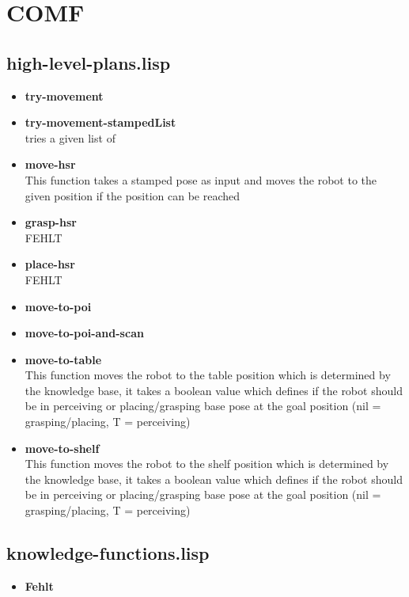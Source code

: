 \documentclass[main.tex]{subfiles}
\begin{document}
	  	\section{COMF}
	    \subsection{high-level-plans.lisp}
	    \begin{itemize}
	    \item \textbf{try-movement} \\
	    
		\item \textbf{try-movement-stampedList} \\
		tries a given list of
	    \item \textbf{move-hsr} \\
	    This function takes a stamped pose as input and moves the robot to the given position if the position can be reached
	    \item \textbf{grasp-hsr} \\
	    FEHLT
	    \item \textbf{place-hsr} \\
	    FEHLT
	    \item \textbf{move-to-poi} \\
	    \item \textbf{move-to-poi-and-scan} \\
	    \item \textbf{move-to-table} \\
	    This function moves the robot to the table position which is determined by the knowledge base, it takes a boolean value which defines if the robot should be in perceiving or placing/grasping base pose at the goal position (nil = grasping/placing, T = perceiving) 
	    \item \textbf{move-to-shelf} \\
	    This function moves the robot to the shelf position which is determined by the knowledge base, it takes a boolean value which defines if the robot should be in perceiving or placing/grasping base pose at the goal position (nil = grasping/placing, T = perceiving) 
		\end{itemize}
	    \subsection{knowledge-functions.lisp}
	    \begin{itemize}
	    	\item \textbf{Fehlt} \\
	    \end{itemize}
\end{document}
